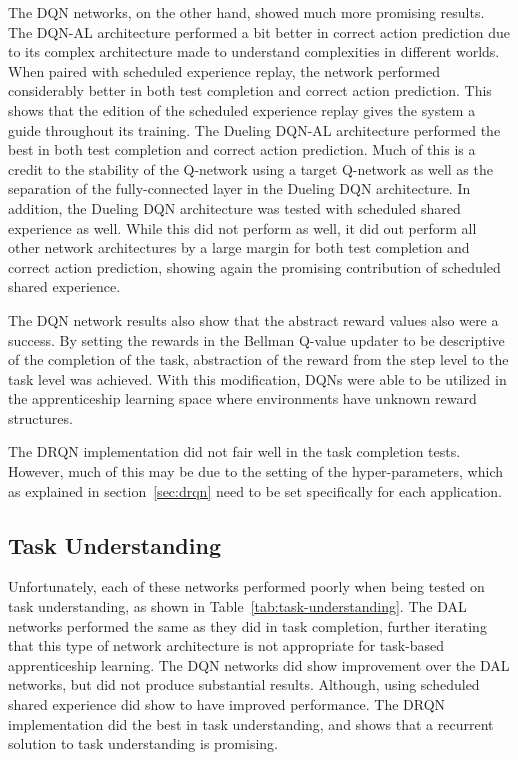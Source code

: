 \documentclass[12pt,american]{report}
\begin{document}
The DQN networks, on the other hand, showed much more promising results. The DQN-AL architecture performed a bit better in correct action prediction due to its complex architecture made to understand complexities in different worlds. When paired with scheduled experience replay, the network performed considerably better in both test completion and correct action prediction.  This shows that the edition of the scheduled experience replay gives the system a guide throughout its training.  The Dueling DQN-AL architecture performed the best in both test completion and correct action prediction.  Much of this is a credit to the stability of the Q-network using a target Q-network as well as the separation of the fully-connected layer in the Dueling DQN architecture.  In addition, the Dueling DQN architecture was tested with scheduled shared experience as well.  While this did not perform as well, it did out perform all other network architectures by a large margin for both test completion and correct action prediction, showing again the promising contribution of scheduled shared experience. 

The DQN network results also show that the abstract reward values also were a success. By setting the rewards in the Bellman Q-value updater to be descriptive of the completion of the task, abstraction of the reward from the step level to the task level was achieved.  With this modification, DQNs were able to be utilized in the apprenticeship learning space where environments have unknown reward structures. 

The DRQN implementation did not fair well in the task completion tests. However, much of this may be due to the setting of the hyper-parameters, which as explained in section~\ref{sec:drqn} need to be set specifically for each application.

\subsection{Task Understanding}
Unfortunately, each of these networks performed poorly when being tested on task understanding, as shown in Table~\ref{tab:task-understanding}.  The DAL networks performed the same as they did in task completion, further iterating that this type of network architecture is not appropriate for task-based apprenticeship learning. The DQN networks did show improvement over the DAL networks, but did not produce substantial results.  Although, using scheduled shared experience did show to have improved performance.  The DRQN implementation did the best in task understanding, and shows that a recurrent solution to task understanding is promising. 
\end{document}
